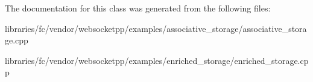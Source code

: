 The documentation for this class was generated from the following files\+:\begin{DoxyCompactItemize}
\item 
libraries/fc/vendor/websocketpp/examples/associative\+\_\+storage/associative\+\_\+storage.\+cpp\item 
libraries/fc/vendor/websocketpp/examples/enriched\+\_\+storage/enriched\+\_\+storage.\+cpp\end{DoxyCompactItemize}
